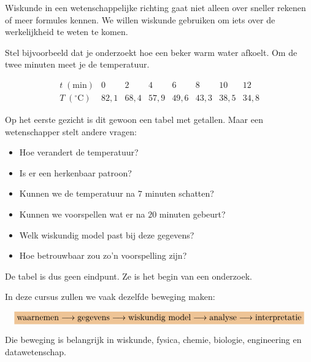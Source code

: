 \documentclass{ximera}
\begin{document}


Wiskunde in een wetenschappelijke richting gaat niet alleen over sneller
rekenen of meer formules kennen. We willen wiskunde gebruiken om iets over de werkelijkheid te weten
te komen.

Stel bijvoorbeeld dat je onderzoekt hoe een beker warm water afkoelt.
Om de twee minuten meet je de temperatuur.

\[
\begin{array}{c|ccccccc}
t\;(\mathrm{min})
&0&2&4&6&8&10&12\\ \hline
T\;({}^{\circ}\mathrm C)
&82{,}1&68{,}4&57{,}9&49{,}6&43{,}3&38{,}5&34{,}8
\end{array}
\]

Op het eerste gezicht is dit gewoon een tabel met getallen. Maar een wetenschapper stelt andere vragen:

\begin{itemize}
  \item Hoe verandert de temperatuur?
  \item Is er een herkenbaar patroon?
  \item Kunnen we de temperatuur na $7$ minuten schatten?
  \item Kunnen we voorspellen wat er na $20$ minuten gebeurt?
  \item Welk wiskundig model past bij deze gegevens?
  \item Hoe betrouwbaar zou zo'n voorspelling zijn?
\end{itemize}

De tabel is dus geen eindpunt. Ze is het begin van een onderzoek.

\begin{opmerking}
In deze cursus zullen we vaak dezelfde beweging maken:

\[
\important{
\text{waarnemen}
\longrightarrow
\text{gegevens}
\longrightarrow
\text{wiskundig model}
\longrightarrow
\text{analyse}
\longrightarrow
\text{interpretatie}
}
\]

Die beweging is belangrijk in wiskunde, fysica, chemie, biologie,
engineering en datawetenschap.
\end{opmerking}


\end{document}
